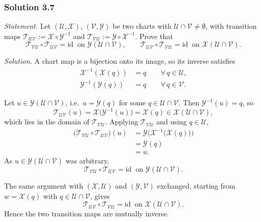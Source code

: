 \documentclass[11pt]{article}
\begin{document}
\subsubsection*{Solution 3.7}

\noindent\textit{Statement.} Let $(\mathcal U,\mathcal X)$, $(\mathcal V,\mathcal Y)$ be two charts with $\mathcal U\cap\mathcal V\neq\emptyset$, with transition maps $\mathcal T_{\mathcal{UV}}:=\mathcal X\circ\mathcal Y^{-1}$ and $\mathcal T_{\mathcal{VU}}:=\mathcal Y\circ\mathcal X^{-1}$. Prove that
\[
\mathcal T_{\mathcal{VU}}\circ\mathcal T_{\mathcal{UV}}=\mathrm{id}\ \text{ on }\mathcal Y(\mathcal U\cap\mathcal V),
\qquad
\mathcal T_{\mathcal{UV}}\circ\mathcal T_{\mathcal{VU}}=\mathrm{id}\ \text{ on }\mathcal X(\mathcal U\cap\mathcal V).
\]

\medskip
\noindent\textit{Solution.} A chart map is a bijection onto its image, so its inverse satisfies
\begin{align*}
\mathcal X^{-1}(\mathcal X(q))&=q\qquad\forall\,q\in\mathcal U,\\
\mathcal Y^{-1}(\mathcal Y(q))&=q\qquad\forall\,q\in\mathcal V.
\end{align*}

Let $u\in\mathcal Y(\mathcal U\cap\mathcal V)$, i.e.\ $u=\mathcal Y(q)$ for some $q\in\mathcal U\cap\mathcal V$. Then $\mathcal Y^{-1}(u)=q$, so
\[
\mathcal T_{\mathcal{UV}}(u)=\mathcal X\big(\mathcal Y^{-1}(u)\big)=\mathcal X(q)\in\mathcal X(\mathcal U\cap\mathcal V),
\]
which lies in the domain of $\mathcal T_{\mathcal{VU}}$. Applying $\mathcal T_{\mathcal{VU}}$ and using $q\in\mathcal U$,
\begin{align*}
\big(\mathcal T_{\mathcal{VU}}\circ\mathcal T_{\mathcal{UV}}\big)(u)
&=\mathcal Y\Big(\mathcal X^{-1}\big(\mathcal X(q)\big)\Big)\\
&=\mathcal Y(q)\\
&=u.
\end{align*}
As $u\in\mathcal Y(\mathcal U\cap\mathcal V)$ was arbitrary,
\[
\mathcal T_{\mathcal{VU}}\circ\mathcal T_{\mathcal{UV}}=\mathrm{id}\ \text{ on }\mathcal Y(\mathcal U\cap\mathcal V).
\]

The same argument with $(\mathcal X,\mathcal U)$ and $(\mathcal Y,\mathcal V)$ exchanged, starting from $w=\mathcal X(q)$ with $q\in\mathcal U\cap\mathcal V$, gives
\[
\mathcal T_{\mathcal{UV}}\circ\mathcal T_{\mathcal{VU}}=\mathrm{id}\ \text{ on }\mathcal X(\mathcal U\cap\mathcal V).
\]
Hence the two transition maps are mutually inverse.

\end{document}
